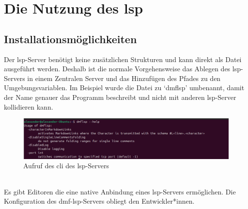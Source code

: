 \documentclass[./einleitung.tex]{subfiles}
\begin{document}
    \section{Die Nutzung des \acrshort{lsp}}
    \subsection{Installationsmöglichkeiten}
    Der \acrshort{lsp}-Server benötigt keine zusätzlichen Strukturen und kann direkt als Datei ausgeführt werden.
    Deshalb ist die normale Vorgehensweise das Ablegen des \acrshort{lsp}-Servers in einem Zentralen Server und das Hinzufügen des Pfades zu den Umgebungsvariablen.
    Im Beispiel wurde die Datei zu `dmflsp' umbenannt, damit der Name genauer das Programm beschreibt und nicht mit anderen \acrshort{lsp}-Server kollidieren kann.\\
    \begin{figure}[H]
        \centering
        \includegraphics[width=\linewidth]{bilder/screenshot-lsp-help}
        \caption{Aufruf des \acrshort{cli} des \acrshort{lsp}-Servers}
        \label{fig:screenshot-lsp-help}
    \end{figure}\\
    Es gibt Editoren die eine native Anbindung eines \acrshort{lsp}-Servers ermöglichen.
    Die Konfiguration des \acrshort{dmf}-\acrshort{lsp}-Servers obliegt den Entwickler*innen.

    \newpage
\end{document}
